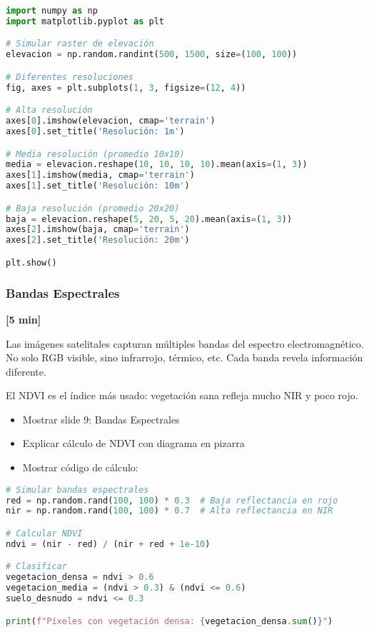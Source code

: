 \documentclass[11pt,a4paper]{article}
\newcommand{\tiempo}[1]{\textcolor{timecolor}{\textbf{[#1]}}}
\newcommand{\decir}[1]{\begin{tcolorbox}[colback=blue!5,colframe=usachblue,title={DECIR}]#1\end{tcolorbox}}
\newcommand{\hacer}[1]{\begin{tcolorbox}[colback=green!5,colframe=green!50!black,title={HACER}]#1\end{tcolorbox}}
\begin{document}
\begin{lstlisting}[language=Python]
import numpy as np
import matplotlib.pyplot as plt

# Simular raster de elevación
elevacion = np.random.randint(500, 1500, size=(100, 100))

# Diferentes resoluciones
fig, axes = plt.subplots(1, 3, figsize=(12, 4))

# Alta resolución
axes[0].imshow(elevacion, cmap='terrain')
axes[0].set_title('Resolución: 1m')

# Media resolución (promedio 10x10)
media = elevacion.reshape(10, 10, 10, 10).mean(axis=(1, 3))
axes[1].imshow(media, cmap='terrain')
axes[1].set_title('Resolución: 10m')

# Baja resolución (promedio 20x20)
baja = elevacion.reshape(5, 20, 5, 20).mean(axis=(1, 3))
axes[2].imshow(baja, cmap='terrain')
axes[2].set_title('Resolución: 20m')

plt.show()
\end{lstlisting}

\subsubsection{Bandas Espectrales} \tiempo{5 min}

\decir{
Las imágenes satelitales capturan múltiples bandas del espectro electromagnético. No solo RGB visible, sino infrarrojo, térmico, etc. Cada banda revela información diferente.

El NDVI es el índice más usado: vegetación sana refleja mucho NIR y poco rojo.
}

\hacer{
\begin{itemize}
    \item Mostrar slide 9: Bandas Espectrales
    \item Explicar cálculo de NDVI con diagrama en pizarra
    \item Mostrar código de cálculo:
\end{itemize}
}

\begin{lstlisting}[language=Python]
# Simular bandas espectrales
red = np.random.rand(100, 100) * 0.3  # Baja reflectancia en rojo
nir = np.random.rand(100, 100) * 0.7  # Alta reflectancia en NIR

# Calcular NDVI
ndvi = (nir - red) / (nir + red + 1e-10)

# Clasificar
vegetacion_densa = ndvi > 0.6
vegetacion_media = (ndvi > 0.3) & (ndvi <= 0.6)
suelo_desnudo = ndvi <= 0.3

print(f"Píxeles con vegetación densa: {vegetacion_densa.sum()}")
\end{lstlisting}
\end{document}
